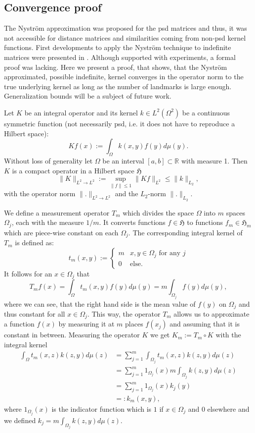 \documentclass[twoside,11pt]{article}
\begin{document}
\subsection{Convergence proof}
The Nystr\"om approximation was proposed for the psd matrices
and thus, it was not accessible for distance matrices
and similarities coming from non-psd kernel functions.
First developments to apply the Nystr\"om technique to indefinite matrices
were presented in \cite{nips10gismokham,Schleif2012k}.
Although supported with experiments, a formal proof was lacking.
Here we present a proof, that shows, that the Nystr\"om approximated, 
possible indefinite, kernel converges in the operator norm to the true underlying kernel
as long as the number of landmarks is large enough. Generalization bounds will be a subject of future work.

Let $K$ be an integral operator and its kernel
$k\in L^2(\Omega^2)$ be a continuous symmetric function (not necessarily psd, i.e. it does not have to reproduce a Hilbert space):
\[
K f(x) := \int_\Omega k(x,y)f(y) d\mu(y).
\]
Without loss of generality let $\Omega$ be an interval $[a,b]\subset \mathbb{R}$
with measure 1.
Then $K$ is a compact operator in a Hilbert space $\mathfrak{H}$
\[
\|K\|_{L^2 \to L^2} :=
  \sup_{\|f\|\leq 1} \|K f\|_{L^2}
\leq \|k\|_{L_2},
\]
with the operator norm $\|.\|_{L^2 \to L^2}$ and the $L_2$-norm $\|.\|_{L_2}$.

We define a measurement operator $T_m$
which divides the space $\Omega$ into $m$ spaces $\Omega_j$,
each with the measure $1/m$.
It converts functions $f \in \mathfrak{H}$
to functions $f_m \in \mathfrak{H}_m$ which are piece-wise constant on each $\Omega_j$.
The corresponding integral kernel of $T_m$ is defined as:
\[
t_m(x,y):=
\begin{cases}
m & x, y \in \Omega_j \text{ for any } j \\
0 & \text{else}.
\end{cases}
\]
It follows for an $x \in \Omega_j$ that
\[
T_m f(x) = \int_\Omega t_m(x,y) f(y) d\mu(y) = m
\int_{\Omega_j} f(y) d\mu(y),
\]
where we can see, that the right hand side is 
the mean value of $f(y)$ on $\Omega_j$
and thus constant for all $x \in \Omega_j$.
This way, the operator $T_m$ allows us to approximate a function $f(x)$
by measuring it at $m$ places $f(x_j)$ and assuming that it is constant in between.
Measuring the operator $K$ we get $K_m := T_m \circ K$ with the integral kernel
\begin{align*}
\int_\Omega t_m(x,z) k(z,y) d\mu(z)
& = \sum_{j=1}^m \int_{\Omega_j} t_m(x,z) k(z,y) d\mu(z) \\
& = \sum_{j=1}^m 1_{\Omega_j}(x) m \int_{\Omega_j} k(z,y) d\mu(z) \\
& = \sum_{j=1}^m 1_{\Omega_j}(x) k_j(y) \\
& =: k_m(x,y),
\end{align*}
where $1_{\Omega_j}(x)$ is the indicator function which is $1$ if $x \in \Omega_j$
and $0$ elsewhere and we defined
$k_j=m \int_{\Omega_j} k(z,y) d\mu(z)$.
\end{document}

